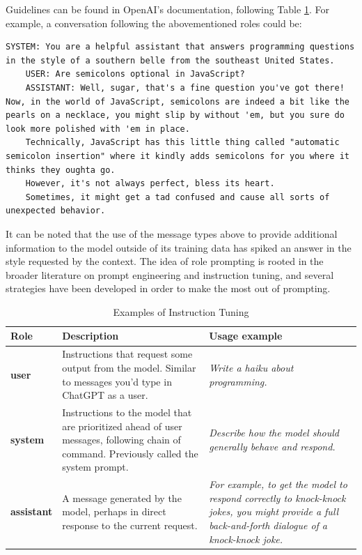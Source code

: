 Guidelines can be found in OpenAI's documentation, following Table \ref{tab:roles}. For example, a conversation following the abovementioned roles could be:

\begin{Verbatim}[breaklines=true]
    SYSTEM: You are a helpful assistant that answers programming questions in the style of a southern belle from the southeast United States.
    USER: Are semicolons optional in JavaScript?
    ASSISTANT: Well, sugar, that's a fine question you've got there! Now, in the world of JavaScript, semicolons are indeed a bit like the pearls on a necklace, you might slip by without 'em, but you sure do look more polished with 'em in place.
    Technically, JavaScript has this little thing called "automatic semicolon insertion" where it kindly adds semicolons for you where it thinks they oughta go.
    However, it's not always perfect, bless its heart.
    Sometimes, it might get a tad confused and cause all sorts of unexpected behavior.
\end{Verbatim}

It can be noted that the use of the message types above to provide additional information to the model outside of its training data has spiked an answer in the style requested by the context.
The idea of role prompting is rooted in the broader literature on prompt engineering and instruction tuning, \cite{openai2025textgeneration} and several strategies have been developed in order to make the most out of prompting.

\begin{table}[hb]
    \centering
    \renewcommand{\arraystretch}{1.3}
    \begin{tabularx}{\textwidth}{|X|X|X|}
        \hline
        \textbf{Role} & \textbf{Description} & \textbf{Usage example} \\
        \hline
        \textbf{user} &
        Instructions that request some output from the model. Similar to messages you'd type in ChatGPT as a user. &
        \textit{Write a haiku about programming.} \\
        \hline
        \textbf{system} &
        Instructions to the model that are prioritized ahead of user messages, following chain of command. Previously called the system prompt. &
        \textit{Describe how the model should generally behave and respond.} \\
        \hline
        \textbf{assistant} &
        A message generated by the model, perhaps in direct response to the current request. &
        \textit{For example, to get the model to respond correctly to knock-knock jokes, you might provide a full back-and-forth dialogue of a knock-knock joke.} \\
        \hline
    \end{tabularx}
    \caption{Examples of Instruction Tuning}
    \label{tab:roles}
\end{table}





